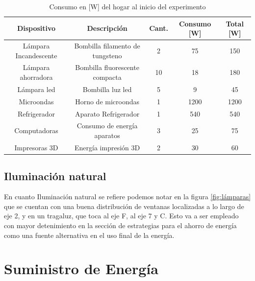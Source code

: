 \documentclass[]{article}
\begin{document}
\begin{table}[h!]
\centering

\begin{tabular}{||c|c|c|c|c||}
\hline
Dispositivo           & Descripción                     & Cant. & Consumo {[}W{]} & Total [W] \\ \hline\hline
Lámpara Incandescente & Bombilla filamento de tungsteno & 2                  & 75              & 150           \\ \hline
Lámpara ahorradora    & Bombilla fluorescente compacta  & 10                 & 18              & 180           \\ \hline
Lámpara led           & Bombilla luz led                & 5                  & 9               & 45            \\ \hline
Microondas            & Horno de microondas             & 1                  & 1200            & 1200          \\ \hline
Refrigerador          & Aparato Refrigerador            & 1                  & 540             & 540           \\ \hline
Computadoras          & Consumo de energía aparatos     & 3                  & 25              & 75            \\ \hline
Impresoras 3D         & Energía impresión 3D            & 2                  & 30              & 60            \\ \hline
\end{tabular}
\caption{Consumo en [W] del hogar al inicio del experimento}
\label{tablaConsumo}
\end{table}

\subsection{Iluminación natural}


En cuanto Iluminación natural se refiere podemos notar en la figura \ref{fig:lámparas} que se cuentan con una buena distribución de ventanas localizadas a lo largo de eje 2, y en un tragaluz, que toca al eje F, al eje 7 y C. Esto va a ser empleado con mayor detenimiento en la sección de estrategias para el ahorro de energía como una fuente alternativa en el uso final de la energía.\\

\section{Suministro de Energía
}
\end{document}
